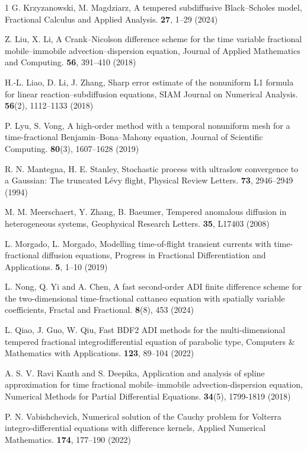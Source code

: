 \documentclass[10pt, reqno]{amsart}
\theoremstyle{remark}
\theoremstyle{definition}
\numberwithin{table}{section}
\begin{document}
\begin{thebibliography}{1}
G. Krzyzanowski, M. Magdziarz, A tempered subdiffusive Black–Scholes model, Fractional Calculus and Applied Analysis. \textbf{27}, 1--29 (2024)

Z. Liu, X. Li, A Crank–Nicolson difference scheme for the time variable fractional mobile–immobile advection–dispersion equation, Journal of Applied Mathematics and Computing. \textbf{56}, 391--410 (2018)

H.-L. Liao, D. Li, J. Zhang, Sharp error estimate of the nonuniform L1 formula for linear reaction–subdiffusion equations, SIAM Journal on Numerical Analysis. \textbf{56}(2), 1112--1133 (2018)

P. Lyu, S. Vong, A high-order method with a temporal nonuniform mesh for a time-fractional Benjamin–Bona–Mahony equation, Journal of Scientific Computing. \textbf{80}(3), 1607--1628 (2019)

R. N. Mantegna, H. E. Stanley, Stochastic process with ultraslow convergence to a Gaussian: The truncated Lévy flight, Physical Review Letters. \textbf{73}, 2946--2949 (1994)

M. M. Meerschaert, Y. Zhang, B. Baeumer, Tempered anomalous diffusion in heterogeneous systems, Geophysical Research Letters. \textbf{35}, L17403 (2008)

L. Morgado, L. Morgado, Modelling time-of-flight transient currents with time-fractional diffusion equations, Progress in Fractional Differentiation and Applications. \textbf{5}, 1--10 (2019)

L. Nong, Q. Yi and A. Chen, A fast second-order ADI finite difference scheme for the two-dimensional time-fractional cattaneo equation with spatially variable coefficients, Fractal and Fractional. \textbf{8}(8), 453 (2024)


L. Qiao, J. Guo, W. Qiu, Fast BDF2 ADI methods for the multi-dimensional tempered fractional integrodifferential equation of parabolic type, Computers \& Mathematics with Applications. \textbf{123}, 89--104 (2022)

A. S. V. Ravi Kanth and S. Deepika, Application and analysis of spline approximation for time fractional mobile–immobile advection-dispersion equation, Numerical Methods for Partial Differential Equations.  \textbf{34}(5), 1799-1819 (2018)

P. N. Vabishchevich, Numerical solution of the Cauchy problem for Volterra integro-differential equations with difference kernels, Applied Numerical Mathematics. \textbf{174}, 177--190 (2022)


\end{thebibliography}
\end{document}
